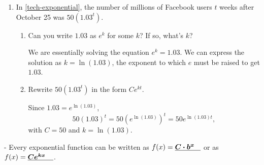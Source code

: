 \documentclass{article}
\makeatletter
\newlength{\tipmargin}
\renewenvironment{framed}{
  \setlength{\tipmargin}{\textwidth-\linewidth}
  \advance\@totalleftmargin-\tipmargin
  \def\FrameCommand{\hspace{\tipmargin}\fbox}%
  \advance\linewidth\tipmargin
  \MakeFramed {\advance\hsize-\width \FrameRestore}%
}
{\endMakeFramed}
\makeatother
\begin{document}
\begin{enumerate}[resume]
\item  


  In \ref{tech-exponential}, the number of millions of Facebook users $t$ weeks after October 25 was $50 \left( 1.03^t \right)$.

  \begin{enumerate}

  \item
    \begin{problem}[\vfill]
      Can you write $1.03$ as $e^k$ for some $k$?  If so, what's $k$? 
    \end{problem}

    \begin{solution}
      We are essentially solving the equation $e^k = 1.03$.
      We can express the solution as $k=\ln(1.03)$, the exponent
      to which $e$ must be raised to get $1.03$. 
    \end{solution}

  \item
    \begin{problem}[0.35in]
      Rewrite $50 \left( 1.03^t \right)$ in the form $C e^{kt}$.
    \end{problem}

    \begin{solution}
      Since $1.03 = e^{\ln(1.03)}$,
      \[50(1.03)^t  = 50(e^{\ln(1.03)})^t = 50e^{\ln(1.03)t},\]
      with $C=50$ and $k=\ln(1.03)$.
    \end{solution}

  \end{enumerate}

\end{enumerate}
\begin{framed} \label{summary:exp-2-forms}
  Every exponential function can be written as $f(x) = \fitb{0.5in}{C \cdot b^x}$ or as $f(x) = \fitb{0.5in}{C e^{kx}}$.  
\end{framed}
\end{document}
